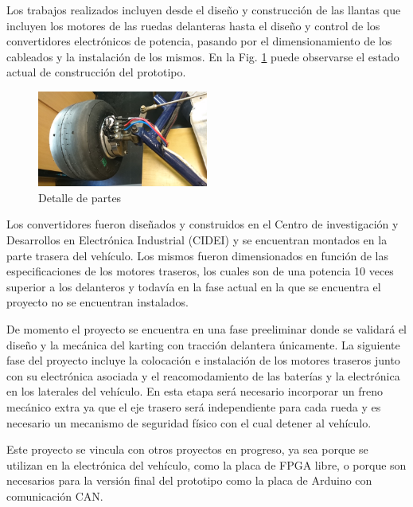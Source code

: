 \documentclass[a4paper]{article}
\begin{document}
Los trabajos realizados incluyen desde el diseño y construcción de las llantas que incluyen los motores de las ruedas delanteras hasta el diseño y control de los convertidores electrónicos de potencia, pasando por el dimensionamiento de los cableados y la instalación de los mismos. En la Fig. \ref{fig:kart2} puede observarse el estado actual de construcción del prototipo.
%
\begin{figure}[h]
    \centering
    \includegraphics[width=0.5\textwidth]{figs/kart2.jpg}
    \caption{Detalle de partes}
    \label{fig:kart2}
\end{figure}

Los convertidores fueron diseñados y construidos en el Centro de investigación y Desarrollos en Electrónica Industrial (CIDEI) y se encuentran montados en la parte trasera del vehículo. Los mismos fueron dimensionados en función de las especificaciones de los motores traseros, los cuales son de una potencia 10 veces superior a los delanteros y todavía en la fase actual en la que se encuentra el proyecto no se encuentran instalados.

De momento el proyecto se encuentra en una fase preeliminar donde se validará el diseño y la mecánica del karting con tracción delantera únicamente. La siguiente fase del proyecto incluye la colocación e instalación de los motores traseros junto con su electrónica asociada y el reacomodamiento de las baterías y la electrónica en los laterales del vehículo. En esta etapa será necesario incorporar un freno mecánico extra ya que el eje trasero será independiente para cada rueda y es necesario un mecanismo de seguridad físico con el cual detener al vehículo.

Este proyecto se vincula con otros proyectos en progreso, ya sea porque se utilizan en la electrónica del vehículo, como la placa de FPGA libre, o porque son necesarios para la versión final del prototipo como la placa de Arduino con comunicación CAN.
\end{document}
